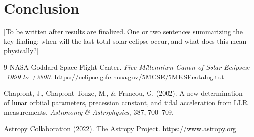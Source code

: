 \documentclass[11pt]{article}
\begin{document}
\section*{Conclusion}

[To be written after results are finalized.
One or two sentences summarizing the key finding:
when will the last total solar eclipse occur, and what does
this mean physically?]

\begin{thebibliography}{9}
    NASA Goddard Space Flight Center.
    \textit{Five Millennium Canon of Solar Eclipses: -1999 to +3000}.
    \url{https://eclipse.gsfc.nasa.gov/5MCSE/5MKSEcatalog.txt}

    Chapront, J., Chapront-Touze, M., \& Francou, G. (2002).
    A new determination of lunar orbital parameters, precession constant,
    and tidal acceleration from LLR measurements.
    \textit{Astronomy \& Astrophysics}, 387, 700--709.

    Astropy Collaboration (2022).
    The Astropy Project.
    \url{https://www.astropy.org}
\end{thebibliography}
\end{document}
